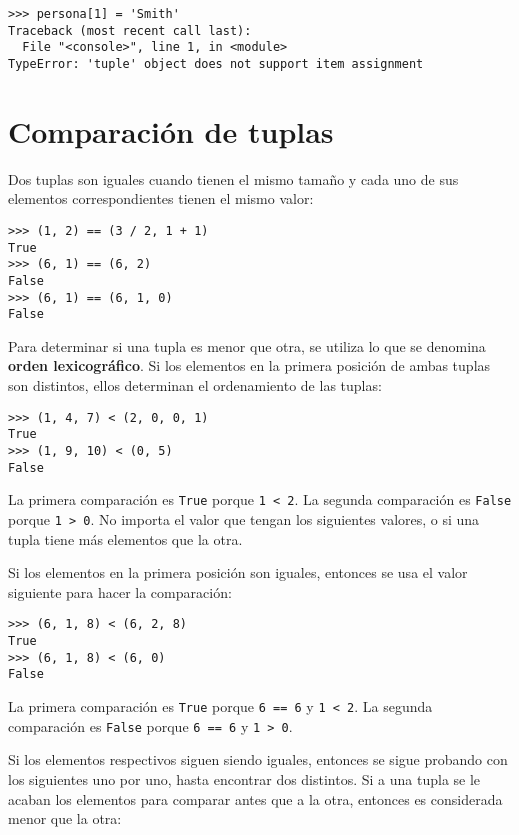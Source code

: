 \begin{lstlisting}
>>> persona[1] = 'Smith'
Traceback (most recent call last):
  File "<console>", line 1, in <module>
TypeError: 'tuple' object does not support item assignment
\end{lstlisting}

\section{Comparación de tuplas}

Dos tuplas son iguales cuando tienen el mismo tamaño y cada uno de sus
elementos correspondientes tienen el mismo valor:

\begin{lstlisting}
>>> (1, 2) == (3 / 2, 1 + 1)
True
>>> (6, 1) == (6, 2)
False
>>> (6, 1) == (6, 1, 0)
False
\end{lstlisting}

Para determinar si una tupla es menor que otra, se utiliza lo que se
denomina \textbf{orden lexicográfico}. Si los elementos en la primera
posición de ambas tuplas son distintos, ellos determinan el ordenamiento
de las tuplas:

\begin{lstlisting}
>>> (1, 4, 7) < (2, 0, 0, 1)
True
>>> (1, 9, 10) < (0, 5)
False
\end{lstlisting}

La primera comparación es \lstinline!True! porque \lstinline!1 < 2!. La
segunda comparación es \lstinline!False! porque \lstinline!1 > 0!. No
importa el valor que tengan los siguientes valores, o si una tupla tiene
más elementos que la otra.

Si los elementos en la primera posición son iguales, entonces se usa el
valor siguiente para hacer la comparación:

\begin{lstlisting}
>>> (6, 1, 8) < (6, 2, 8)
True
>>> (6, 1, 8) < (6, 0)
False
\end{lstlisting}

La primera comparación es \lstinline!True! porque \lstinline!6 == 6! y
\lstinline!1 < 2!. La segunda comparación es \lstinline!False! porque
\lstinline!6 == 6! y \lstinline!1 > 0!.

Si los elementos respectivos siguen siendo iguales, entonces se sigue
probando con los siguientes uno por uno, hasta encontrar dos distintos.
Si a una tupla se le acaban los elementos para comparar antes que a la
otra, entonces es considerada menor que la otra:

